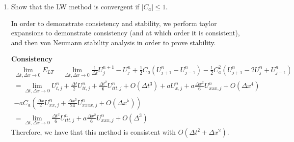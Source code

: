 \documentclass{article}
\begin{document}
\begin{enumerate}[label = (\alph*)]
    \item Show that the LW method is convergent if $|C_a| \le 1$. 
    
        In order to demonstrate consistency and stability, we perform taylor
        expansions to demonstrate consistency (and at which order it is
        consistent), and then von Neumann stability analysis in order to prove
        stability.

        \textbf{Consistency}
        \begin{gather*}
            \lim_{\Delta t, \Delta x \to 0} E_{LT} = 
            \lim_{\Delta t, \Delta x \to 0} \frac{1}{\Delta t} U_j^{n+1} - U_j^n
            + \frac{1}{2}C_a\left(U_{j+1}^n - U_{j-1}^n\right)
            - \frac{1}{2}C_a^2\left(U_{j+1}^n - 2U_j^n + U_{j-1}^n\right)\\
           =  \lim_{\Delta t, \Delta x \to 0} U_{t, j}^n + 
            \frac{\Delta t}{2}U_{tt, j}^n + \frac{\Delta t^2}{6}U_{ttt, j}^n +
            O(\Delta t^3)
            + aU_{x, j}^n + a\frac{\Delta
            x^2}{6}U_{xxx, j}^n + O(\Delta x^4) \\- aC_a\left(
            \frac{\Delta x}{2}U_{xx, j}^n + \frac{\Delta x^3}{24}U_{xxxx, j}^n
            + O(\Delta x^5)\right)\\
            = \lim_{\Delta t, \Delta x \to 0} \frac{\Delta t^2}{6}U_{ttt, j}^n +
            a \frac{\Delta x^2}{6}U_{xxx, j}^n + O(\Delta^3)
        \end{gather*}
        Therefore, we have that this method is consistent with $O(\Delta t^2 +
        \Delta x^2)$. 


\end{enumerate}
\end{document}
